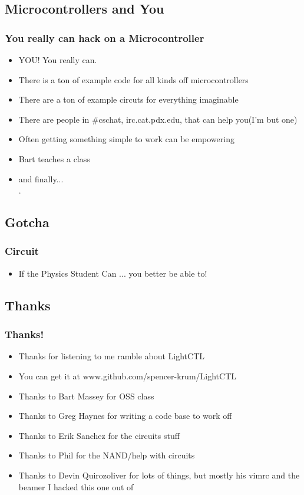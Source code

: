 \documentclass{beamer}
\begin{document}
\subsection{Microcontrollers and You}
\frame
{
	\frametitle{You really can hack on a Microcontroller}
	\begin{itemize}
		\item YOU! You really can.
		\item There is a ton of example code for all kinds off microcontrollers
		\item There are a ton of example circuts for everything imaginable
		\item There are people in \#cschat, irc.cat.pdx.edu, that can help you(I'm but one)
		\item Often getting something simple to work can be empowering
		\item Bart teaches a class
		\item and finally... \\.
	\end{itemize}
}


\subsection{Gotcha}
\frame
{
	\frametitle{Circuit}
	\begin{itemize}
		\item If the Physics Student Can ... you better be able to!
	\end{itemize}
}
\subsection{Thanks}
\frame
{
	\frametitle{Thanks!}
	\begin{itemize}
		\item Thanks for listening to me ramble about LightCTL
		\item You can get it at www.github.com/spencer-krum/LightCTL
		\item Thanks to Bart Massey for OSS class
		\item Thanks to Greg Haynes for writing a code base to work off
		\item Thanks to Erik Sanchez for the circuits stuff
		\item Thanks to Phil for the NAND/help with circuits
		\item Thanks to Devin Quirozoliver for lots of things, but mostly his vimrc and the beamer I hacked this one out of
	\end{itemize}
}
\end{document}

